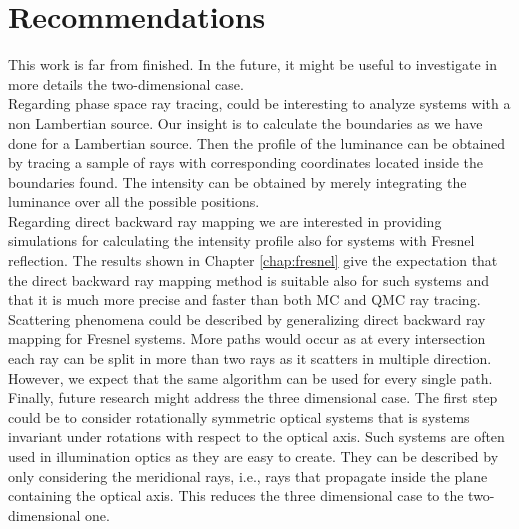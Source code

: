 \section{Recommendations}
This work is far from finished. In the future, it might be useful to investigate in more details the two-dimensional case. \\ \indent 
Regarding phase space ray tracing, could be interesting to analyze systems with a non Lambertian source. Our insight is to calculate the boundaries as we have done for a Lambertian source. Then the profile of the luminance can be obtained by tracing a sample of rays with corresponding coordinates located inside the boundaries found. The intensity can be obtained by merely integrating the luminance over all the possible positions. \\ \indent 
Regarding direct backward ray mapping we are interested in providing simulations for calculating the intensity profile also for systems with Fresnel reflection. The results shown in Chapter \ref{chap:fresnel} give the expectation that the direct backward ray mapping method is suitable also for such systems and that it is much more precise and faster than both MC and QMC ray tracing. Scattering phenomena could be described by generalizing direct backward ray mapping for Fresnel systems. More paths would occur as at every intersection each ray can be split in more than two rays as it scatters in multiple direction. However, we expect that the same algorithm can be used for every single path. 
 \\ \indent 
Finally, future research might address the three dimensional case. The first step could be to consider rotationally symmetric optical systems that is systems invariant under rotations with respect to the optical axis. Such systems are often used in illumination optics as they are easy to create. They can be described by only considering the meridional rays, i.e., rays that propagate inside the plane containing the optical axis. This reduces the three dimensional case to the two-dimensional one. 
